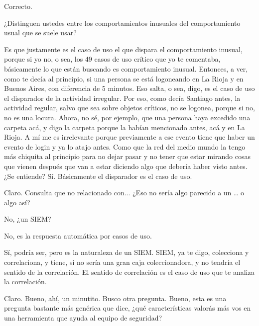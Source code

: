 \begin{description}[leftmargin=0cm, labelsep=0.5cm]
    \item[\textbf{PITA GUILLERMO:}] Correcto.

    \item[\textbf{MUNTAABSKI FEDERICO:}] ¿Distinguen ustedes entre los comportamientos inusuales del comportamiento usual que se suele usar?

    \item[\textbf{PITA GUILLERMO:}] Es que justamente es el caso de uso el que dispara el comportamiento inusual, porque si yo no, o sea, los 49 casos de uso crítico que yo te comentaba, básicamente lo que están buscando es comportamiento inusual. Entonces, a ver, como te decía al principio, si una persona se está logoneando en La Rioja y en Buenos Aires, con diferencia de 5 minutos. Eso salta, o sea, digo, es el caso de uso el disparador de la actividad irregular. Por eso, como decía Santiago antes, la actividad regular, salvo que sea sobre objetos críticos, no se logonea, porque si no, no es una locura. Ahora, no sé, por ejemplo, que una persona haya excedido una carpeta acá, y digo la carpeta porque la habían mencionado antes, acá y en La Rioja. A mí me es irrelevante porque previamente a ese evento tiene que haber un evento de login y ya lo atajo antes. Como que la red del medio mundo la tengo más chiquita al principio para no dejar pasar y no tener que estar mirando cosas que vienen después que van a estar diciendo algo que debería haber visto antes. ¿Se entiende? Sí. Básicamente el disparador es el caso de uso.

    \item[\textbf{MUNTAABSKI FEDERICO:}] Claro. Consulta que no relacionado con... ¿Eso no sería algo parecido a un … o algo así?

    \item[\textbf{PITA GUILLERMO:}] No, ¿un SIEM?

    \item[\textbf{MUNTAABSKI FEDERICO:}] No, es la respuesta automática por casos de uso.

    \item[\textbf{PITA GUILLERMO:}] Sí, podría ser, pero es la naturaleza de un SIEM. SIEM, ya te digo, colecciona y correlaciona, y tiene, si no sería una gran caja coleccionadora, y no tendría el sentido de la correlación. El sentido de correlación es el caso de uso que te analiza la correlación.

    \item[\textbf{MUNTAABSKI FEDERICO:}] Claro. Bueno, ahí, un minutito. Busco otra pregunta. Bueno, esta es una pregunta bastante más genérica que dice, ¿qué características valorás más vos en una herramienta que ayuda al equipo de seguridad?


\end{description}
